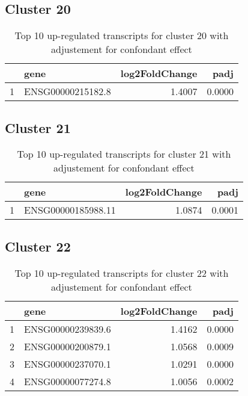 \documentclass{article}
\begin{document}
\subsection{Cluster 20 }
\begin{table}[H]
\centering
\begin{tabularx}{\textwidth}{rlrr}
  \hline
 & gene & log2FoldChange & padj \\ 
  \hline
1 & ENSG00000215182.8 & 1.4007 & 0.0000 \\ 
   \hline
\end{tabularx}
\caption{Top 10 up-regulated transcripts for cluster 20 with adjustement for confondant effect} 
\label{tab:q3_1_conf_20}
\end{table}
\subsection{Cluster 21 }
\begin{table}[H]
\centering
\begin{tabularx}{\textwidth}{rlrr}
  \hline
 & gene & log2FoldChange & padj \\ 
  \hline
1 & ENSG00000185988.11 & 1.0874 & 0.0001 \\ 
   \hline
\end{tabularx}
\caption{Top 10 up-regulated transcripts for cluster 21 with adjustement for confondant effect} 
\label{tab:q3_1_conf_21}
\end{table}
\subsection{Cluster 22 }
\begin{table}[H]
\centering
\begin{tabularx}{\textwidth}{rlrr}
  \hline
 & gene & log2FoldChange & padj \\ 
  \hline
1 & ENSG00000239839.6 & 1.4162 & 0.0000 \\ 
  2 & ENSG00000200879.1 & 1.0568 & 0.0009 \\ 
  3 & ENSG00000237070.1 & 1.0291 & 0.0000 \\ 
  4 & ENSG00000077274.8 & 1.0056 & 0.0002 \\ 
   \hline
\end{tabularx}
\caption{Top 10 up-regulated transcripts for cluster 22 with adjustement for confondant effect} 
\label{tab:q3_1_conf_22}
\end{table}
\end{document}

